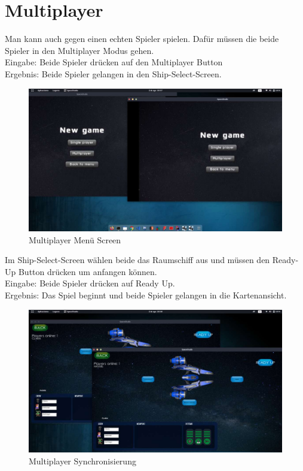 \documentclass[12pt]{article}
\begin{document}
\section{Multiplayer}
Man kann auch gegen einen echten Spieler spielen. Dafür müssen die beide Spieler in den Multiplayer Modus gehen.\\
Eingabe: Beide Spieler drücken auf den Multiplayer Button\\
Ergebnis: Beide Spieler gelangen in den Ship-Select-Screen.\\
\begin{figure}[htp]
	\centering
	\includegraphics[scale=0.4]{TestProtocolBilder/Multiplayer/1.jpg}
	\caption{Multiplayer Menü Screen}
\end{figure}
\clearpage
Im Ship-Select-Screen wählen beide das Raumschiff aus und müssen den Ready-Up Button drücken um anfangen können.\\
Eingabe: Beide Spieler drücken auf Ready Up.\\
Ergebnis: Das Spiel beginnt und beide Spieler gelangen in die Kartenansicht.\\
\begin{figure}[htp]
	\centering
	\includegraphics[scale=0.4]{TestProtocolBilder/Multiplayer/2.jpg}
	\caption{Multiplayer Synchronisierung}
\end{figure}
\end{document}
